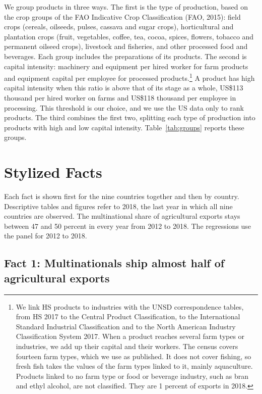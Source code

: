 \documentclass[article, 12pt, 3p]{elsarticle}
\numberwithin{corollary}{proposition}
\begin{document}
We group products in three ways. The first is the type of production, based on the crop groups of the FAO Indicative
Crop Classification (FAO, 2015): field crops (cereals, oilseeds, pulses, cassava and sugar crops), horticultural and
plantation crops (fruit, vegetables, coffee, tea, cocoa, spices, flowers, tobacco and permanent oilseed crops), livestock
and fisheries, and other processed food and beverages. Each group includes the preparations of its products. The second
is capital intensity: machinery and equipment per hired worker for farm products and equipment capital per employee for
processed products.\footnote{We link HS products to industries with the UNSD correspondence tables, from HS 2017 to the
Central Product Classification, to the International Standard Industrial Classification and to the North American Industry
Classification System 2017. When a product reaches several farm types or industries, we add up their capital and their
workers. The census covers fourteen farm types, which we use as published. It does not cover fishing, so fresh fish takes
the values of the farm types linked to it, mainly aquaculture. Products linked to no farm type or food or beverage
industry, such as bran and ethyl alcohol, are not classified. They are 1 percent of exports in 2018.} A product has high
capital intensity when this ratio is above that of its stage as a whole, US\$113 thousand per hired worker on farms and
US\$118 thousand per employee in processing. This threshold is our choice, and we use the US data only to rank products.
The third combines the first two, splitting each type of production into products with high and low capital intensity.
Table~\ref{tab:groups} reports these groups.

\section{Stylized Facts}\label{sec:facts}

Each fact is shown first for the nine countries together and then by country. Descriptive tables and figures refer to
2018, the last year in which all nine countries are observed. The multinational share of agricultural exports stays between
47 and 50 percent in every year from 2012 to 2018. The regressions use the panel for 2012 to 2018.

\subsection{Fact 1: Multinationals ship almost half of agricultural exports}\label{sec:f1}
\end{document}
